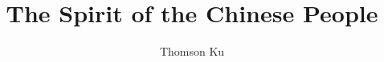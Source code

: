 \documentclass[graybox,envcountchap,sectrefs]{svmono}
\newcommand{\doctitle}{The Spirit of the Chinese People}
\newcommand{\docauthor}{Thomson Ku}
\newcommand{\docsubject}{}
\newcommand{\doctitle}{春秋大義}
\newcommand{\docauthor}{辜鴻銘}
\newcommand{\docsubject}{中國人的精神}
\begin{document}
\author{\docauthor}
\title{\doctitle}
\subtitle{\docsubject}
\maketitle

\frontmatter%

%

\foreword


\preface


%

\tableofcontents

%



\mainmatter%
%


\end{document}
